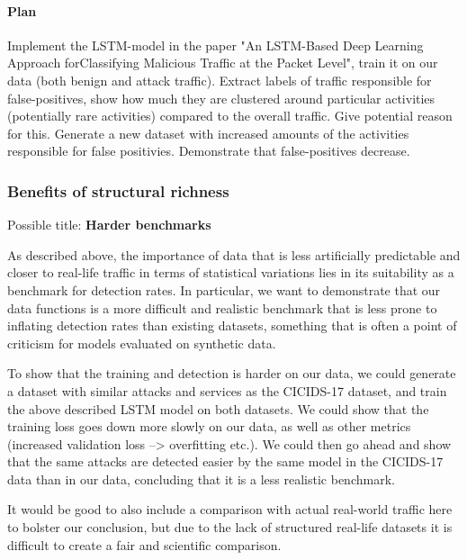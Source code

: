 \documentclass{article}
\begin{document}
\paragraph{Plan}
Implement the LSTM-model in the paper "An LSTM-Based Deep Learning Approach forClassifying Malicious Traffic at the Packet Level", train it on our data (both benign and attack traffic). Extract labels of traffic responsible for false-positives, show how much they are clustered around particular activities (potentially rare activities) compared to the overall traffic. Give potential reason for this. Generate a new dataset with increased amounts of the activities responsible for false positivies. Demonstrate that false-positives decrease.

\subsubsection{Benefits of structural richness}

Possible title: \textbf{Harder benchmarks}

As described above, the importance of data that is less artificially predictable and closer to real-life traffic in terms of statistical variations lies in its suitability as a benchmark for detection rates. In particular, we want to demonstrate that our data functions is a more difficult and realistic benchmark that is less prone to inflating detection rates than existing datasets, something that is often a point of criticism for models evaluated on synthetic data. 

To show that the training and detection is harder on our data, we could generate a dataset with similar attacks and services as the CICIDS-17 dataset, and train the above described LSTM model on both datasets. We could show that the training loss goes down more slowly on our data, as well as other metrics (increased validation loss --> overfitting etc.). We could then go ahead and show that the same attacks are detected easier by the same model in the CICIDS-17 data than in our data, concluding that it is a less realistic benchmark.

It would be good to also include a comparison with actual real-world traffic here to bolster our conclusion, but due to the lack of structured real-life datasets it is difficult to create a fair and scientific comparison. 

\end{document}
